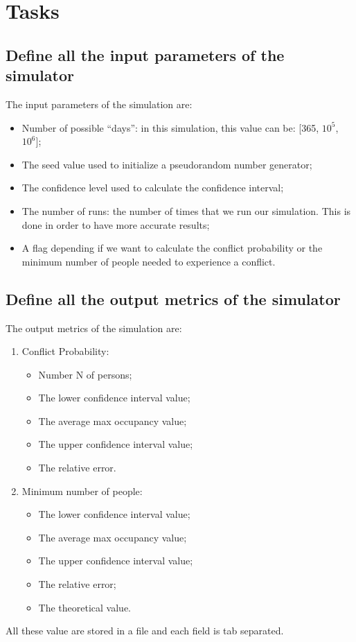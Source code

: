 \documentclass{report}
\begin{document}
{	\section{Tasks}
	 
		\subsection{Define all the input parameters of the simulator}
			The input parameters of the simulation are:
			\begin{itemize}
				\item Number of possible ``days'': in this simulation, this value can be: [365, $10^5$, $10^6$];
				\item The seed value used to initialize a pseudorandom number generator;
				\item The confidence level used to calculate the confidence interval;
				\item The number of runs: the number of times that we run our simulation. This is done in order to have more accurate results;
				\item A flag depending if we want to calculate the conflict probability or the minimum number of people needed to experience a conflict.
			\end{itemize}
			 
	\subsection{Define all the output metrics of the simulator}
			The output metrics of the simulation are:
			\begin{enumerate}
					\item Conflict Probability:
					\begin{itemize}
							\item Number N of persons;
							\item The lower confidence interval value;
							\item The average max occupancy value;
							\item The upper confidence interval value;
							\item The relative error.
					\end{itemize}
					\item Minimum number of people:
					\begin{itemize}
							\item The lower confidence interval value;
							\item The average max occupancy value;
							\item The upper confidence interval value;
							\item The relative error;
							\item The theoretical value.
					\end{itemize}
			\end{enumerate}
			All these value are stored in a file and each field is tab separated.
	
}
\end{document}
